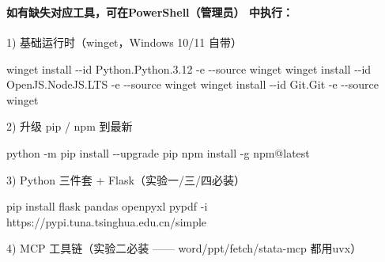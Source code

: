 \documentclass[
  american,
  chinese,
]{ctexart}
\begin{document}
{\begin{longtable}[]
\begin{minipage}[t]{\linewidth}
\foreignlanguage{american}{\hfill\break
\hfill\break
}\strut
\end{minipage} \\
\end{longtable}
}

\foreignlanguage{american}{}

~

\paragraph{\texorpdfstring{{\foreignlanguage{american}{如有缺失对应工具，可在}}\foreignlanguage{american}{ {PowerShell{（管理员}}}\foreignlanguage{american}{）}\foreignlanguage{american}{ }{\foreignlanguage{american}{中执行}}\foreignlanguage{american}{：}}{如有缺失对应工具，可在 PowerShell（管理员） 中执行：}}\label{ux5982ux6709ux7f3aux5931ux5bf9ux5e94ux5de5ux5177ux53efux5728-powershellux7ba1ux7406ux5458-ux4e2dux6267ux884c}

\foreignlanguage{american}{1) }{\foreignlanguage{american}{基础运行时（}\foreignlanguage{american}{winget}\foreignlanguage{american}{，}\foreignlanguage{american}{Windows}}\foreignlanguage{american}{ 10/11 }{\foreignlanguage{american}{自带}}\foreignlanguage{american}{）}

{\foreignlanguage{american}{winget}}\foreignlanguage{american}{ install -\/-id Python.Python.3.12 -e -\/-source {winget}
{winget} install -\/-id {OpenJS.NodeJS.LTS}
-e -\/-source {winget} {winget}
install -\/-id {Git.Git} -e -\/-source {winget}}

\foreignlanguage{american}{2) }{\foreignlanguage{american}{升级}}\foreignlanguage{american}{ pip / {npm} }{\foreignlanguage{american}{到最新}}

\foreignlanguage{american}{python -m pip install -\/-upgrade pip {npm} install -g {npm@latest}}

\foreignlanguage{american}{3) Python }{\foreignlanguage{american}{三件套}}\foreignlanguage{american}{ + {Flask{（实验一}}/}\foreignlanguage{american}{三}\foreignlanguage{american}{/}{\foreignlanguage{american}{四必装}}\foreignlanguage{american}{）}

\foreignlanguage{american}{pip install flask pandas {openpyxl} {pypdf} -{i} https://pypi.tuna.tsinghua.edu.cn/simple}

\foreignlanguage{american}{4) MCP }{\foreignlanguage{american}{工具链（实验二必装}}\foreignlanguage{american}{ ------ word/ppt/fetch/{stata-mcp} }{\foreignlanguage{american}{都用}}\foreignlanguage{american}{ {uvx}}\foreignlanguage{american}{）}
\end{document}
